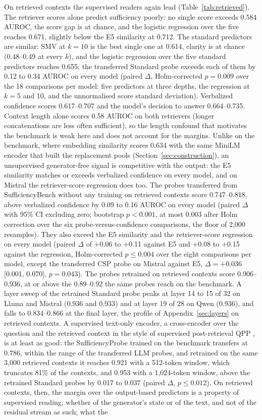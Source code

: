 \documentclass[acmsmall,screen,review]{acmart}
\newcommand{\bench}{SufficiencyBench}
\newcommand{\sprobe}{SufficiencyProbe}
\begin{document}
On retrieved contexts the supervised readers again lead (Table~\ref{tab:retrieved}). The retriever scores alone predict sufficiency poorly: no single score exceeds 0.584 AUROC, the score gap is at chance, and the logistic regression over the five reaches 0.671, slightly below the E5 similarity at 0.712. The standard predictors are similar: SMV at $k = 10$ is the best single one at 0.614, clarity is at chance (0.48--0.49 at every $k$), and the logistic regression over the five standard predictors reaches 0.655; the transferred Standard probe exceeds each of them by 0.12 to 0.34 AUROC on every model (paired $\Delta$, Holm-corrected $p = 0.009$ over the 18 comparisons per model: five predictors at three depths, the regression at $k = 5$ and 10, and the unnormalised score standard deviation). Verbalized confidence scores 0.617--0.707 and the model's decision to answer 0.664--0.735. Context length alone scores 0.58 AUROC on both retrievers (longer concatenations are less often sufficient), so the length confound that motivates the benchmark is weak here and does not account for the margins. Unlike on the benchmark, where embedding similarity scores 0.634 with the same MiniLM encoder that built the replacement pools (Section~\ref{sec:construction}), an unsupervised generator-free signal is competitive with the output: the E5 similarity matches or exceeds verbalized confidence on every model, and on Mistral the retriever-score regression does too. The probes transferred from \bench{} without any training on retrieved contexts score 0.747--0.818, above verbalized confidence by 0.09 to 0.16 AUROC on every model (paired $\Delta$ with 95\% CI excluding zero; bootstrap $p < 0.001$, at most 0.003 after Holm correction over the six probe-versus-confidence comparisons, the floor of 2,000 resamples). They also exceed the E5 similarity and the retriever-score regression on every model (paired $\Delta$ of $+$0.06 to $+$0.11 against E5 and $+$0.08 to $+$0.15 against the regression, Holm-corrected $p \leq 0.004$ over the eight comparisons per model, except the transferred CSP probe on Mistral against E5, $\Delta = +0.036$ [0.001, 0.070], $p = 0.043$). The probes retrained on retrieved contexts score 0.906--0.936, at or above the 0.89--0.92 the same probes reach on the benchmark. A layer sweep of the retrained Standard probe peaks at layer 14 to 15 of 32 on Llama and Mistral (0.936 and 0.933) and at layer 19 of 28 on Qwen (0.936), and falls to 0.834--0.866 at the final layer, the profile of Appendix~\ref{sec:layers} on retrieved contexts. A supervised text-only encoder, a cross-encoder over the question and the retrieved context in the style of supervised post-retrieval QPP \citep{arabzadeh2021bertqpp}, is at least as good: the \sprobe{} trained on the benchmark transfers at 0.786, within the range of the transferred LLM probes, and retrained on the same 3,000 retrieved contexts it reaches 0.921 with a 512-token window, which truncates 81\% of the contexts, and 0.953 with a 1,024-token window, above the retrained Standard probes by 0.017 to 0.037 (paired $\Delta$, $p \leq 0.012$). On retrieved contexts, then, the margin over the output-based predictors is a property of supervised reading, whether of the generator's state or of the text, and not of the residual stream as such; what the 
\end{document}
